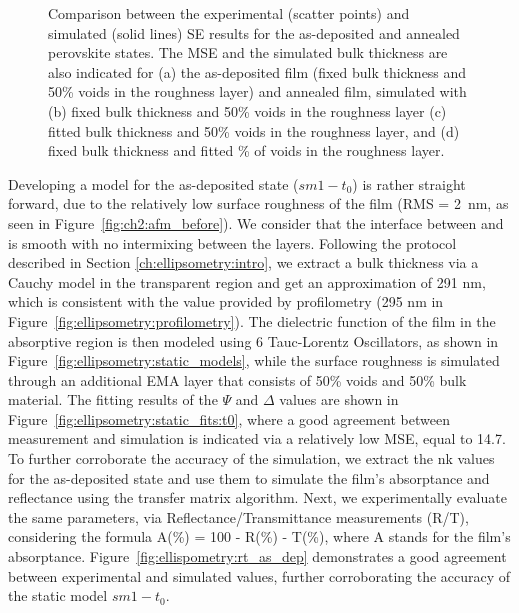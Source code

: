 \begin{figure}[t]
\begin{subfigure}[t]{0.4\textwidth}
        \caption{}
        \label{fig:ellipsometry:static_fits:t23_fixed_thick_x_void}
    \end{subfigure}
    \caption{Comparison between the experimental (scatter points) and simulated (solid lines) SE results for the as-deposited and annealed perovskite states. The MSE and the simulated bulk thickness are also indicated for (a) the as-deposited film (fixed bulk thickness and 50\% voids in the roughness layer) and annealed film, simulated with (b) fixed bulk thickness and 50\% voids in the roughness layer (c) fitted bulk thickness and 50\% voids in the roughness layer, and (d) fixed bulk thickness and fitted \% of voids in the roughness layer.}
    \label{fig:ellipsometry:static_fits}
\end{figure}

Developing a model for the as-deposited state ($sm1-t_0$) is rather straight forward, due to the relatively low surface roughness of the film (RMS = 2~nm, as seen in Figure~\ref{fig:ch2:afm_before}). We consider that the interface between  and  is smooth with no intermixing between the layers. Following the protocol described in Section \ref{ch:ellipsometry:intro}, we extract a bulk thickness via a Cauchy model in the transparent region and get an approximation of 291 nm, which is consistent with the value provided by profilometry (295 nm in Figure~\ref{fig:ellipsometry:profilometry}). The dielectric function of the film in the absorptive region is then modeled using 6 Tauc-Lorentz Oscillators, as shown in Figure~\ref{fig:ellipsometry:static_models}, while the surface roughness is simulated through an additional EMA layer that consists of 50\% voids and 50\% bulk material. The fitting results of the $\Psi$ and $\Delta$ values are shown in Figure~\ref{fig:ellipsometry:static_fits:t0}, where a good agreement between measurement and simulation is indicated via a relatively low MSE, equal to 14.7. To further corroborate the accuracy of the simulation, we extract the nk values for the as-deposited state and use them to simulate the film's absorptance and reflectance using the transfer matrix algorithm. Next, we experimentally evaluate the same parameters, via Reflectance/Transmittance measurements (R/T), considering the formula A(\%) = 100 - R(\%) - T(\%), where A stands for the film's absorptance. Figure~\ref{fig:ellispometry:rt_as_dep} demonstrates a good agreement between experimental and simulated values, further corroborating the accuracy of the static model $sm1-t_0$.


